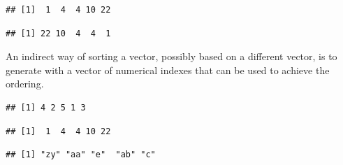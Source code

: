 \documentclass[krantz2]{krantz}\usepackage{knitr}%
\begin{document}
\begin{knitrout}\footnotesize
{}\color{fgcolor}\begin{kframe}
\begin{alltt}
 \hlkwb{<-} \hlstd{(}\hlstd{,} \hlstd{,} \hlstd{,} \hlstd{,} \hlstd{)}
\end{alltt}
\begin{verbatim}
## [1]  1  4  4 10 22
\end{verbatim}
\begin{alltt}
  \hlstd{=} \hlstd{)}
\end{alltt}
\begin{verbatim}
## [1] 22 10  4  4  1
\end{verbatim}
\end{kframe}
\end{knitrout}

An indirect way of sorting a vector, possibly based on a different vector, is to generate with  a vector of numerical indexes that can be used to achieve the ordering.

\begin{knitrout}\footnotesize
{}\color{fgcolor}\begin{kframe}
\begin{alltt}
\end{alltt}
\begin{verbatim}
## [1] 4 2 5 1 3
\end{verbatim}
\begin{alltt}
\hlstd{my.vector[}\hlstd{(my.vector)]}
\end{alltt}
\begin{verbatim}
## [1]  1  4  4 10 22
\end{verbatim}
\begin{alltt}
 \hlkwb{<-} \hlstd{(}\hlstd{,} \hlstd{,} \hlstd{,} \hlstd{,} \hlstd{)}
\hlstd{another.vector[}\hlstd{(my.vector)]}
\end{alltt}
\begin{verbatim}
## [1] "zy" "aa" "e"  "ab" "c"
\end{verbatim}
\end{kframe}
\end{knitrout}
\end{document}
